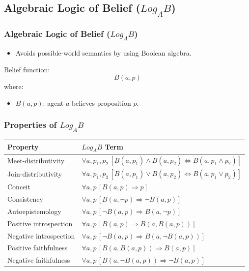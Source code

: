 \documentclass[aspectratio=169]{beamer}
\begin{document}
\subsection{Algebraic Logic of Belief ($Log_AB$)}
\begin{frame}
\frametitle{Algebraic Logic of Belief ($Log_AB$)}
\Large
\begin{itemize}
    \item Avoids possible-world semantics by using Boolean algebra.
\end{itemize}
\begin{block}{Belief function:}
\[
B(a, p)
\]
\normalsize where:
\begin{itemize}
    \item $B(a, p)$: agent $a$ believes proposition $p$.
\end{itemize}
\end{block}
\end{frame}

\begin{frame}
\frametitle{Properties of $Log_AB$}
\centering
{\small
\renewcommand{\arraystretch}{1.5}
\begin{tabular}{|p{4cm}|p{9.5cm}|}
    \hline
    \textbf{Property} & \textbf{$Log_AB$ Term} \\
    \hline
    Meet-distributivity & $\forall a, p_1, p_2\,[B(a, p_1) \wedge B(a, p_2) \Leftrightarrow B(a, p_1 \wedge p_2)]$ \\
    \hline
    Join-distributivity & $\forall a, p_1, p_2\,[B(a, p_1) \vee B(a, p_2) \Leftrightarrow B(a, p_1 \vee p_2)]$ \\
    \hline
    Conceit & $\forall a, p\,[B(a, p) \Rightarrow p]$ \\
    \hline
    Consistency & $\forall a, p\,[B(a, \neg p) \Rightarrow \neg B(a, p)]$ \\
    \hline
    Autoepistemology & $\forall a, p\,[\neg B(a, p) \Rightarrow B(a, \neg p)]$ \\
    \hline
    Positive introspection & $\forall a, p\,[B(a, p) \Rightarrow B(a, B(a, p))]$ \\
    \hline
    Negative introspection & $\forall a, p\,[\neg B(a, p) \Rightarrow B(a, \neg B(a, p))]$ \\
    \hline
    Positive faithfulness & $\forall a, p\,[B(a, B(a, p)) \Rightarrow B(a, p)]$ \\
    \hline
    Negative faithfulness & $\forall a, p\,[B(a, \neg B(a, p)) \Rightarrow \neg B(a, p)]$ \\
    \hline
\end{tabular}
}
\end{frame}
\end{document}
